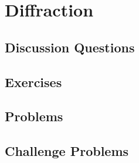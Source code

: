 
\chapter{Diffraction}

\section{Discussion Questions}

\section{Exercises}

\section{Problems}

\section{Challenge Problems}
